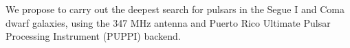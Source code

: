 We propose to carry out the deepest search for pulsars in the Segue I and Coma dwarf galaxies, using the 347 MHz antenna and Puerto Rico Ultimate Pulsar Processing Instrument (PUPPI) backend. 